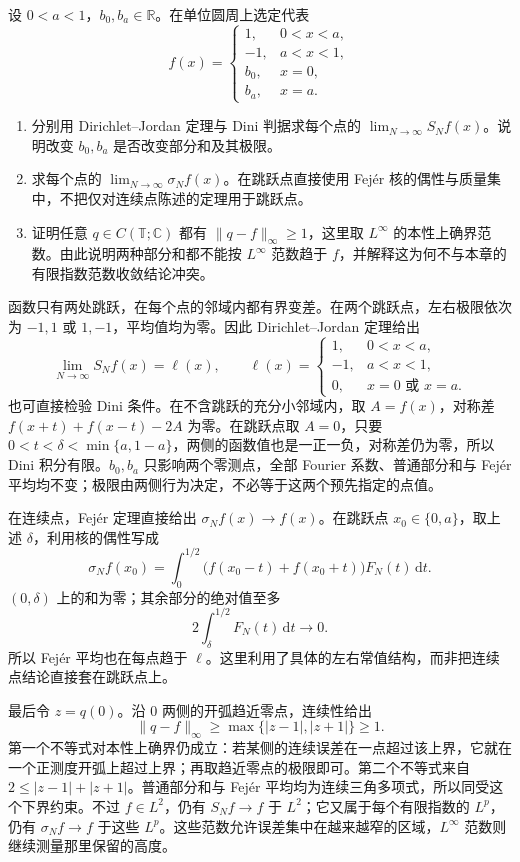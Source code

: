 \begin{exercise}\label{b2:ex:02-step-convergence}
设 \(0<a<1\)，\(b_0,b_a\in\mathbb R\)。在单位圆周上选定代表
\[
 f(x)=\begin{cases}
 1,&0<x<a,\\
 -1,&a<x<1,\\
 b_0,&x=0,\\
 b_a,&x=a.
 \end{cases}
\]
\begin{enumerate}
 \item\label{b2:item:02-step-pointwise} 分别用 Dirichlet--Jordan 定理与 Dini 判据求每个点的 \(\lim_{N\to\infty}S_Nf(x)\)。说明改变 \(b_0,b_a\) 是否改变部分和及其极限。
 \item\label{b2:item:02-step-fejer} 求每个点的 \(\lim_{N\to\infty}\sigma_Nf(x)\)。在跳跃点直接使用 Fejér 核的偶性与质量集中，不把仅对连续点陈述的定理用于跳跃点。
 \item\label{b2:item:02-step-linfty} 证明任意 \(q\in C(\mathbb T;\mathbb C)\) 都有 \(\|q-f\|_\infty\geq1\)，这里取 \(L^\infty\) 的本性上确界范数。由此说明两种部分和都不能按 \(L^\infty\) 范数趋于 \(f\)，并解释这为何不与本章的有限指数范数收敛结论冲突。
\end{enumerate}
\end{exercise}
\begin{solution}
函数只有两处跳跃，在每个点的邻域内都有界变差。在两个跳跃点，左右极限依次为 \(-1,1\) 或 \(1,-1\)，平均值均为零。因此 Dirichlet--Jordan 定理给出
\[
 \lim_{N\to\infty}S_Nf(x)=\ell(x),\qquad
 \ell(x)=\begin{cases}1,&0<x<a,\\-1,&a<x<1,\\0,&x=0\text{ 或 }x=a.\end{cases}
\]
也可直接检验 Dini 条件。在不含跳跃的充分小邻域内，取 \(A=f(x)\)，对称差 \(f(x+t)+f(x-t)-2A\) 为零。在跳跃点取 \(A=0\)，只要 \(0<t<\delta<\min\{a,1-a\}\)，两侧的函数值也是一正一负，对称差仍为零，所以 Dini 积分有限。\(b_0,b_a\) 只影响两个零测点，全部 Fourier 系数、普通部分和与 Fejér 平均均不变；极限由两侧行为决定，不必等于这两个预先指定的点值。

在连续点，Fejér 定理直接给出 \(\sigma_Nf(x)\to f(x)\)。在跳跃点 \(x_0\in\{0,a\}\)，取上述 \(\delta\)，利用核的偶性写成
\[
 \sigma_Nf(x_0)=\int_0^{1/2}
 \bigl(f(x_0-t)+f(x_0+t)\bigr)F_N(t)\,\mathrm dt.
\]
\((0,\delta)\) 上的和为零；其余部分的绝对值至多
\[
 2\int_\delta^{1/2}F_N(t)\,\mathrm dt\longrightarrow0.
\]
所以 Fejér 平均也在每点趋于 \(\ell\)。这里利用了具体的左右常值结构，而非把连续点结论直接套在跳跃点上。

最后令 \(z=q(0)\)。沿 \(0\) 两侧的开弧趋近零点，连续性给出
\[
 \|q-f\|_\infty\geq\max\{|z-1|,|z+1|\}\geq1.
\]
第一个不等式对本性上确界仍成立：若某侧的连续误差在一点超过该上界，它就在一个正测度开弧上超过上界；再取趋近零点的极限即可。第二个不等式来自 \(2\leq|z-1|+|z+1|\)。普通部分和与 Fejér 平均均为连续三角多项式，所以同受这个下界约束。不过 \(f\in L^2\)，仍有 \(S_Nf\to f\) 于 \(L^2\)；它又属于每个有限指数的 \(L^p\)，仍有 \(\sigma_Nf\to f\) 于这些 \(L^p\)。这些范数允许误差集中在越来越窄的区域，\(L^\infty\) 范数则继续测量那里保留的高度。
\end{solution}


